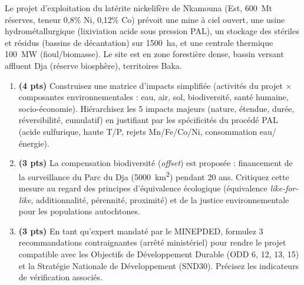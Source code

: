 \documentclass[11pt]{article}
\begin{document}
\begin{exercice}
Le projet d'exploitation du latérite nickelifère de Nkamouna (Est, \SI{600}{Mt} réserves, teneur 0,8\% Ni, 0,12\% Co) prévoit une mine à ciel ouvert, une usine hydrométallurgique (lixiviation acide sous pression PAL), un stockage des stériles et résidus (bassins de décantation) sur \SI{1500}{ha}, et une centrale thermique \SI{100}{MW} (fioul/biomasse). Le site est en zone forestière dense, bassin versant affluent Dja (réserve biosphère), territoires Baka.

\begin{enumerate}
    \item \textbf{(4 pts)} Construisez une matrice d'impacts simplifiée (activités du projet $\times$ composantes environnementales : eau, air, sol, biodiversité, santé humaine, socio-économie). Hiérarchisez les 5 impacts majeurs (nature, étendue, durée, réversibilité, cumulatif) en justifiant par les spécificités du procédé PAL (acide sulfurique, haute T/P, rejets Mn/Fe/Co/Ni, consommation eau/énergie).

    \item \textbf{(3 pts)} La compensation biodiversité (\textit{offset}) est proposée : financement de la surveillance du Parc du Dja (\SI{5000}{km^2}) pendant 20 ans. Critiquez cette mesure au regard des principes d'équivalence écologique (équivalence \textit{like-for-like}, additionnalité, pérennité, proximité) et de la justice environnementale pour les populations autochtones.

    \item \textbf{(3 pts)} En tant qu'expert mandaté par le MINEPDED, formulez 3 recommandations contraignantes (arrêté ministériel) pour rendre le projet compatible avec les Objectifs de Développement Durable (ODD 6, 12, 13, 15) et la Stratégie Nationale de Développement (SND30). Précisez les indicateurs de vérification associés.
\end{enumerate}
\end{exercice}
\end{document}
